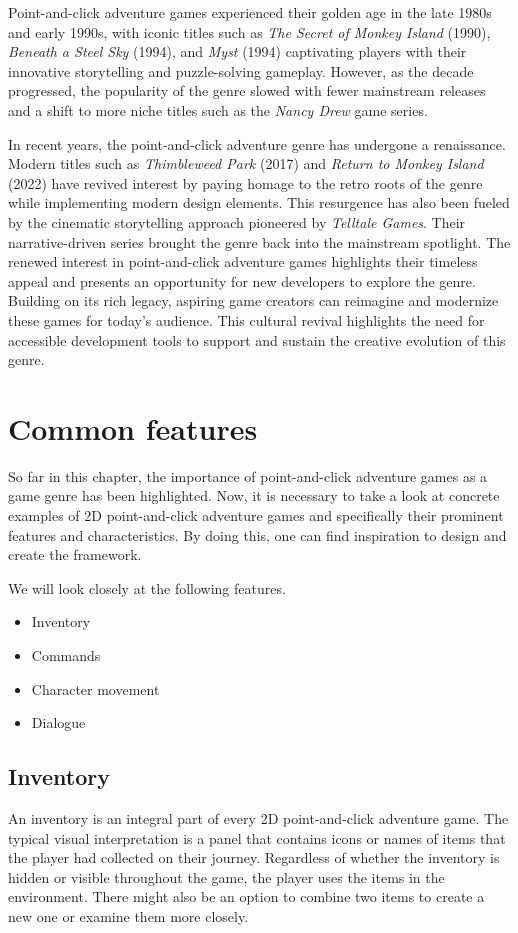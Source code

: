 Point-and-click adventure games experienced their golden age in the late 1980s and early 1990s, with iconic titles such as \textit{The Secret of Monkey Island} (1990), \textit{Beneath a Steel Sky} (1994), and \textit{Myst} (1994) captivating players with their innovative storytelling and puzzle-solving gameplay. However, as the decade progressed, the popularity of the genre slowed\cite{Qaffas202022} with fewer mainstream releases and a shift to more niche titles such as the \textit{Nancy Drew} game series.

In recent years, the point-and-click adventure genre has undergone a renaissance. Modern titles such as \textit{Thimbleweed Park} (2017) and \textit{Return to Monkey Island} (2022) have revived interest by paying homage to the retro roots of the genre while implementing modern design elements. This resurgence has also been fueled by the cinematic storytelling approach pioneered by \textit{Telltale Games}. Their narrative-driven series brought the genre back into the mainstream spotlight. The renewed interest in point-and-click adventure games highlights their timeless appeal and presents an opportunity for new developers to explore the genre. Building on its rich legacy, aspiring game creators can reimagine and modernize these games for today's audience. This cultural revival highlights the need for accessible development tools to support and sustain the creative evolution of this genre.

\section{Common features}
\label{sec:Common features}
So far in this chapter, the importance of point-and-click adventure games as a game genre has been highlighted. Now, it is necessary to take a look at concrete examples of 2D point-and-click adventure games and specifically their prominent features and characteristics. By doing this, one can find inspiration to design and create the framework.

We will look closely at the following features.
\begin{itemize}
\item Inventory
\item Commands
\item Character movement
\item Dialogue
\end{itemize}

\subsection{Inventory}
\label{sec:Inventory}
An inventory is an integral part of every 2D point-and-click adventure game. The typical visual interpretation is a panel that contains icons or names of items that the player had collected on their journey. Regardless of whether the inventory is hidden or visible throughout the game, the player uses the items in the environment. There might also be an option to combine two items to create a new one or examine them more closely. 

